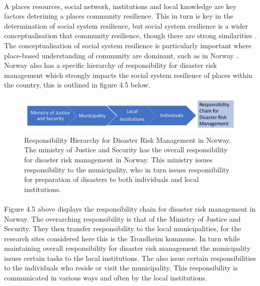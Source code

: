 \paragraph{}

A places resources, social network, institutions and local knowledge are key factors deterining a places community resilience. This in turn is key in the determination of social system resilience, but social system resilience is a wider conceptualisation that community resilience, though there are strong similarities \cite{cutter_community_2020}. The conceptualisation of social system resilience is particularly important where place-based understanding of community are dominant, such as in Norway \cite{rasanen_conceptualizing_2020}. Norway also has a specific hierarchy of responsibility for disaster risk management which strongly impacts the social system resilience of places within the country, this is outlined in figure 4.5 below.


\begin{figure} [h]
    \centering
    \includegraphics[width=1\textwidth]{fig_theory/responsibility drm.png}
    \caption{Responsibility Hierarchy for Disaster Risk Management in Norway. The ministry of Justice and Security has the overall responsibility for disaster risk management in Norway. This ministry issues responsibility to the municipality, who in turn issues responsibility for preparation of disasters to both individuals and local institutions.}
    \label{fig:drm_responsibility}
\end{figure}
\paragraph{}
Figure 4.5 above displays the responsibility chain for disaster risk management in Norway. The overarching responsibility is that of the Ministry of Justice and Security. They then transfer responsibility to the local municipalities, for the research sites considered here this is the Trondheim kommune. In turn while maintaining overall responsibility for disaster risk management the municipality issues certain tasks to the local institutions. The also issue certain responsibilities to the individuals who reside or visit the municipality. This responsibility is communicated in various ways and often by the local institutions. 





